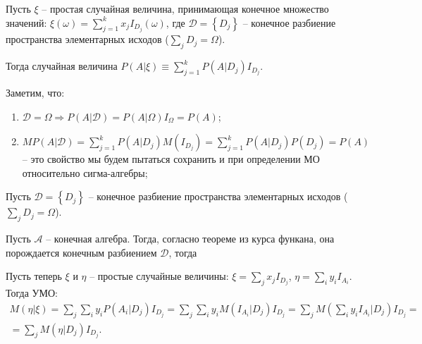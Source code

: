 \begin{definition}
  Пусть $\xi$ -- простая случайная величина, принимающая конечное множество значений:
  $\xi(\omega) = \sum_{j=1}^k x_j I_{D_j}(\omega)$, где
  $\mathcal{D} = \left\{ D_j \right\} $ -- конечное разбиение пространства элементарных
  исходов ($\sum_j D_j = \Omega$).

  Тогда случайная величина $P(A | \xi) \equiv \sum_{j=1}^k P(A|D_j) I_{D_j}$.

  Заметим, что:
  \begin{enumerate}
    \item $\mathcal{D} = \Omega \Rightarrow P(A | \mathcal{D}) = P(A | \Omega) I_\Omega = P(A)$;
    \item $MP(A | \mathcal{D}) = \sum_{j=1}^k P(A | D_j) M(I_{D_j}) =
      \sum_{j=1}^k P(A|D_j) P(D_j) = P(A)$ -- это свойство мы будем пытаться сохранить и
      при определении МО относительно сигма-алгебры;
  \end{enumerate}
\end{definition}


\begin{definition}
  Пусть $\mathcal{D} = \left\{ D_j \right\} $ -- конечное разбиение пространства элементарных
  исходов ($\sum_j D_j = \Omega$). 
\end{definition}

\begin{definition}
  Пусть $\mathcal{A}$ -- конечная алгебра. Тогда, согласно теореме из курса функана, 
  она порождается конечным разбиением $\mathcal{D}$, тогда 
\end{definition}

\begin{definition}
  Пусть теперь $\xi$ и $\eta$ -- простые случайные величины:
  $\xi = \sum_j x_j I_{D_j}$, $\eta = \sum_i y_i I_{A_i}$.
  Тогда УМО:
  \begin{multline*}
    M(\eta | \xi) = \sum_j \sum_i y_i P(A_i | D_j) I_{D_j} =
    \sum_j \sum_i y_i M(I_{A_i} | D_j) I_{D_j} =
    \sum_j M \left( \sum_i y_i I_{A_i} | D_j \right) I_{D_j} =  \\
    = \sum_j M(\eta | D_j) I_{D_j}.
  \end{multline*}
\end{definition}

